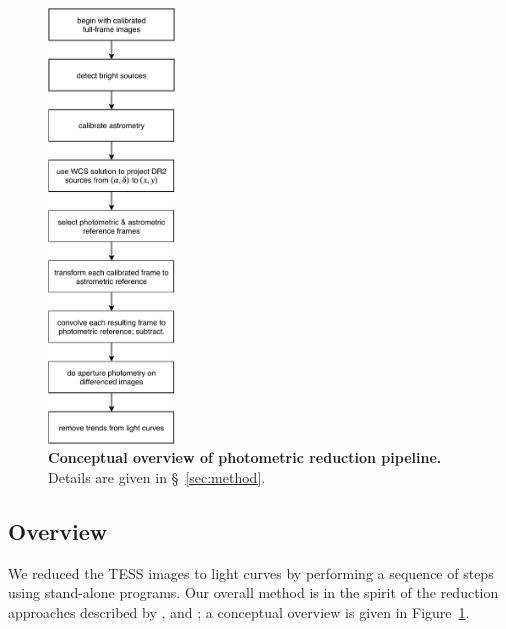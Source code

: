 \documentclass[12pt,twocolumn,tighten]{aastex62}
\begin{document}
\begin{figure}[t]
	\begin{center}
		\leavevmode
		\includegraphics[width=0.3\textwidth]{pipelineoverview.pdf}
	\end{center}
	\vspace{-0.2cm}
	\caption{
    {\bf Conceptual overview of photometric reduction pipeline.}
    Details are given in \S~\ref{sec:method}.
	\label{fig:pipeline}
	}
\end{figure}

\subsection{Overview}

We reduced the TESS images to light curves by performing a sequence of
steps using stand-alone programs.
Our overall method is in the spirit of the reduction approaches described
by \citet{Pal_2009}, \citet{soares-furtado_image_2017} and
\citet{oelkers_precision_2018}; a conceptual overview is given in
Figure~\ref{fig:pipeline}.
\end{document}

